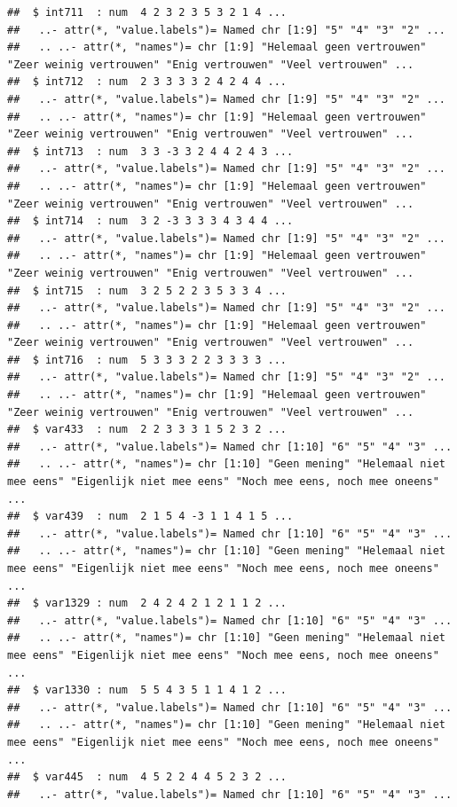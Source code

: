 \documentclass[
]{book}
\begin{document}
\begin{verbatim}
##  $ int711  : num  4 2 3 2 3 5 3 2 1 4 ...
##   ..- attr(*, "value.labels")= Named chr [1:9] "5" "4" "3" "2" ...
##   .. ..- attr(*, "names")= chr [1:9] "Helemaal geen vertrouwen" "Zeer weinig vertrouwen" "Enig vertrouwen" "Veel vertrouwen" ...
##  $ int712  : num  2 3 3 3 3 2 4 2 4 4 ...
##   ..- attr(*, "value.labels")= Named chr [1:9] "5" "4" "3" "2" ...
##   .. ..- attr(*, "names")= chr [1:9] "Helemaal geen vertrouwen" "Zeer weinig vertrouwen" "Enig vertrouwen" "Veel vertrouwen" ...
##  $ int713  : num  3 3 -3 3 2 4 4 2 4 3 ...
##   ..- attr(*, "value.labels")= Named chr [1:9] "5" "4" "3" "2" ...
##   .. ..- attr(*, "names")= chr [1:9] "Helemaal geen vertrouwen" "Zeer weinig vertrouwen" "Enig vertrouwen" "Veel vertrouwen" ...
##  $ int714  : num  3 2 -3 3 3 3 4 3 4 4 ...
##   ..- attr(*, "value.labels")= Named chr [1:9] "5" "4" "3" "2" ...
##   .. ..- attr(*, "names")= chr [1:9] "Helemaal geen vertrouwen" "Zeer weinig vertrouwen" "Enig vertrouwen" "Veel vertrouwen" ...
##  $ int715  : num  3 2 5 2 2 3 5 3 3 4 ...
##   ..- attr(*, "value.labels")= Named chr [1:9] "5" "4" "3" "2" ...
##   .. ..- attr(*, "names")= chr [1:9] "Helemaal geen vertrouwen" "Zeer weinig vertrouwen" "Enig vertrouwen" "Veel vertrouwen" ...
##  $ int716  : num  5 3 3 3 2 2 3 3 3 3 ...
##   ..- attr(*, "value.labels")= Named chr [1:9] "5" "4" "3" "2" ...
##   .. ..- attr(*, "names")= chr [1:9] "Helemaal geen vertrouwen" "Zeer weinig vertrouwen" "Enig vertrouwen" "Veel vertrouwen" ...
##  $ var433  : num  2 2 3 3 3 1 5 2 3 2 ...
##   ..- attr(*, "value.labels")= Named chr [1:10] "6" "5" "4" "3" ...
##   .. ..- attr(*, "names")= chr [1:10] "Geen mening" "Helemaal niet mee eens" "Eigenlijk niet mee eens" "Noch mee eens, noch mee oneens" ...
##  $ var439  : num  2 1 5 4 -3 1 1 4 1 5 ...
##   ..- attr(*, "value.labels")= Named chr [1:10] "6" "5" "4" "3" ...
##   .. ..- attr(*, "names")= chr [1:10] "Geen mening" "Helemaal niet mee eens" "Eigenlijk niet mee eens" "Noch mee eens, noch mee oneens" ...
##  $ var1329 : num  2 4 2 4 2 1 2 1 1 2 ...
##   ..- attr(*, "value.labels")= Named chr [1:10] "6" "5" "4" "3" ...
##   .. ..- attr(*, "names")= chr [1:10] "Geen mening" "Helemaal niet mee eens" "Eigenlijk niet mee eens" "Noch mee eens, noch mee oneens" ...
##  $ var1330 : num  5 5 4 3 5 1 1 4 1 2 ...
##   ..- attr(*, "value.labels")= Named chr [1:10] "6" "5" "4" "3" ...
##   .. ..- attr(*, "names")= chr [1:10] "Geen mening" "Helemaal niet mee eens" "Eigenlijk niet mee eens" "Noch mee eens, noch mee oneens" ...
##  $ var445  : num  4 5 2 2 4 4 5 2 3 2 ...
##   ..- attr(*, "value.labels")= Named chr [1:10] "6" "5" "4" "3" ...

\end{verbatim}
\end{document}
